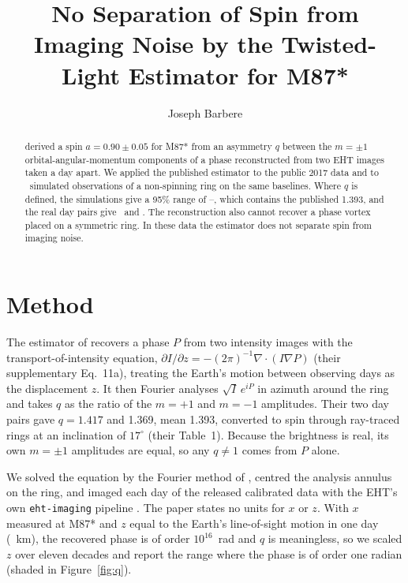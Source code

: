 \documentclass[RNAAS]{aastex631}
\newcommand{\code}[1]{\texttt{#1}}
\begin{document}
\title{No Separation of Spin from Imaging Noise by the Twisted-Light Estimator for M87*}

\author[0009-0008-3289-4447]{Joseph Barbere}

\begin{abstract}
\citet{tamburini2020} derived a spin $a=0.90\pm0.05$ for M87* from an asymmetry $q$ between the
$m=\pm1$ orbital-angular-momentum components of a phase reconstructed from two EHT images taken a
day apart. We applied the published estimator to the public 2017 data and to
\oamspinSynNoneN\ simulated observations of a non-spinning ring on the same baselines. Where $q$
is defined, the simulations give a 95\% range of \oamspinSynNoneLoPone--\oamspinSynNoneHiPone,
which contains the published 1.393, and the real day pairs give \oamspinRealCombAPone\ and
\oamspinRealCombBPone. The reconstruction also cannot recover a phase vortex placed on a symmetric
ring. In these data the estimator does not separate spin from imaging noise.
\end{abstract}

\section{Method}
\label{sec:method}
The estimator of \citet{tamburini2020} recovers a phase $P$ from two intensity images with the
transport-of-intensity equation, $\partial I/\partial z=-(2\pi)^{-1}\nabla\cdot(I\nabla P)$
(their supplementary Eq.~11a), treating the Earth's motion between observing days as the
displacement $z$. It then Fourier analyses $\sqrt{I}\,e^{iP}$ in azimuth around the ring and
takes $q$ as the ratio of the $m=+1$ and $m=-1$ amplitudes. Their two day pairs gave $q=1.417$
and 1.369, mean 1.393, converted to spin through ray-traced rings at an inclination of
$17^\circ$ (their Table~1). Because the brightness is real, its own $m=\pm1$ amplitudes are equal,
so any $q\neq1$ comes from $P$ alone.

We solved the equation by the Fourier method of \citet{teague1983}, centred the analysis annulus
on the ring, and imaged each day of the released calibrated data \citep{ehtdata} with the EHT's
own \code{eht-imaging} pipeline \citep{eht4,chael2016,chael2018}. The paper states no units for
$x$ or $z$. With $x$ measured at M87* and $z$ equal to the Earth's line-of-sight motion in one day
(\oamspinRealDz~km), the recovered phase is of order $10^{16}$~rad and $q$ is meaningless, so we
scaled $z$ over eleven decades and report the range where the phase is of order one radian
(shaded in Figure~\ref{fig:q}).
\end{document}

